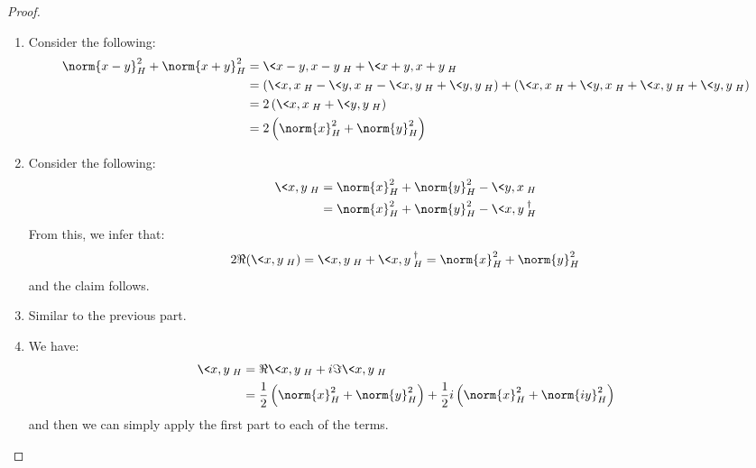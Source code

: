             \begin{proof}
                \begin{enumerate}
                    \item Consider the following:
                        $$
                            \begin{aligned}
                                \norm{x - y}_H^2 + \norm{x + y}_H^2 & = \<x - y, x - y\>_H + \< x + y, x + y \>_H
                                \\
                                & = \left( \<x, x\>_H - \<y, x\>_H - \<x, y\>_H + \<y, y\>_H \right) + \left( \<x, x\>_H + \<y, x\>_H + \<x, y\>_H + \<y, y\>_H \right)
                                \\
                                & = 2\left( \<x, x\>_H + \<y, y\>_H \right)
                                \\
                                & = 2\left( \norm{x}_H^2 + \norm{y}^2_H \right)
                            \end{aligned}
                        $$
                    \item Consider the following:
                        $$
                            \begin{aligned}
                                \<x, y\>_H & = \norm{x}_H^2 + \norm{y}^2_H - \<y, x\>_H
                                \\
                                & = \norm{x}_H^2 + \norm{y}^2_H - \<x, y\>_H^{\dagger}
                            \end{aligned}
                        $$
                    From this, we infer that:
                        $$2\Re( \<x, y\>_H ) = \<x, y\>_H + \<x, y\>_H^{\dagger} = \norm{x}_H^2 + \norm{y}^2_H$$
                    and the claim follows.
                    \item Similar to the previous part.
                    \item We have:
                        $$
                            \begin{aligned}
                                \<x, y\>_H & = \Re\<x, y\>_H + i \Im \<x, y\>_H
                                \\
                                & = \frac12\left( \norm{x}_H^2 + \norm{y}^2_H \right) + \frac12 i \left( \norm{x}_H^2 + \norm{iy}^2_H \right)
                            \end{aligned}
                        $$
                    and then we can simply apply the first part to each of the terms.
                \end{enumerate}
            \end{proof}
            
